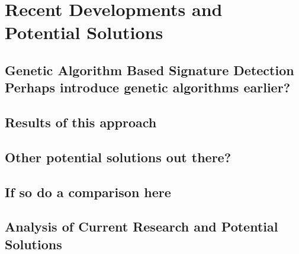 \chapter{Recent Developments and Potential Solutions}

\section{Genetic Algorithm Based Signature Detection Perhaps introduce genetic algorithms earlier?}

\section{Results of this approach}

\section{Other potential solutions out there?}

\section{If so do a comparison here}

\section{Analysis of Current Research and Potential Solutions}
